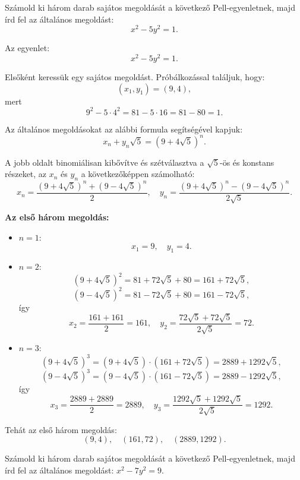 \begin{problem}
Számold ki három darab sajátos megoldását a következő Pell-egyenletnek,
majd írd fel az általános megoldást: 
\[
x^{2}-5y^{2}=1.
\]
\end{problem}

\begin{solution}
Az egyenlet: 
\[
x^{2}-5y^{2}=1.
\]

Elsőként keressük egy sajátos megoldást. Próbálkozással találjuk,
hogy: 
\[
(x_{1},y_{1})=(9,4),
\]
mert 
\[
9^{2}-5\cdot4^{2}=81-5\cdot16=81-80=1.
\]

Az általános megoldásokat az alábbi formula segítségével kapjuk: 
\[
x_{n}+y_{n}\sqrt{5}=(9+4\sqrt{5})^{n}.
\]

A jobb oldalt binomiálisan kibővítve és szétválasztva a $\sqrt{5}$-ös
és konstans részeket, az $x_{n}$ és $y_{n}$ a következőképpen számolható:
\[
x_{n}=\frac{(9+4\sqrt{5})^{n}+(9-4\sqrt{5})^{n}}{2},\quad y_{n}=\frac{(9+4\sqrt{5})^{n}-(9-4\sqrt{5})^{n}}{2\sqrt{5}}.
\]

\textbf{Az első három megoldás:}\\
\begin{itemize}
\item $n=1$: 
\[
x_{1}=9,\quad y_{1}=4.
\]
\item $n=2$: 
\[
(9+4\sqrt{5})^{2}=81+72\sqrt{5}+80=161+72\sqrt{5},
\]
\[
(9-4\sqrt{5})^{2}=81-72\sqrt{5}+80=161-72\sqrt{5},
\]
így 
\[
x_{2}=\frac{161+161}{2}=161,\quad y_{2}=\frac{72\sqrt{5}+72\sqrt{5}}{2\sqrt{5}}=72.
\]
\item $n=3$: 
\[
(9+4\sqrt{5})^{3}=(9+4\sqrt{5})\cdot(161+72\sqrt{5})=2889+1292\sqrt{5},
\]
\[
(9-4\sqrt{5})^{3}=(9-4\sqrt{5})\cdot(161-72\sqrt{5})=2889-1292\sqrt{5},
\]
így 
\[
x_{3}=\frac{2889+2889}{2}=2889,\quad y_{3}=\frac{1292\sqrt{5}+1292\sqrt{5}}{2\sqrt{5}}=1292.
\]
\end{itemize}
Tehát az első három megoldás: 
\[
(9,4),\quad(161,72),\quad(2889,1292).
\]
\end{solution}
\begin{problem}
Számold ki három darab sajátos megoldását a következő Pell-egyenletnek,
majd írd fel az általános megoldást: $x^{2}-7y^{2}=9$. 
\end{problem}

